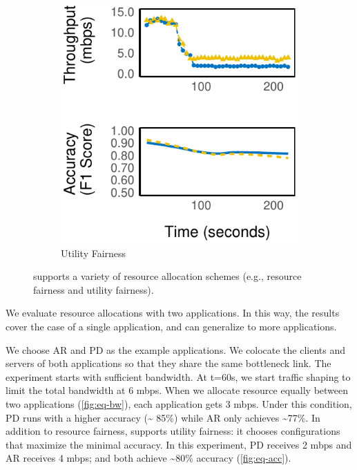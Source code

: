 \begin{figure}
\begin{subfigure}[t]{0.45\columnwidth}
    \includegraphics[width=\textwidth]{figures/multitask-right.pdf}
    \caption{Utility Fairness}
    \label{fig:eq-acc}
  \end{subfigure}
  \caption{\sysname{} supports a variety of resource allocation schemes (e.g.,
    resource fairness and utility fairness).}
  \label{fig:multitask}
\end{figure}

We evaluate resource allocations with two applications. In this way, the results
cover the case of a single application, and can generalize to more applications.

We choose AR and PD as the example applications.  We colocate the clients and
servers of both applications so that they share the same bottleneck link. The
experiment starts with sufficient bandwidth. At t=60s, we start traffic shaping
to limit the total bandwidth at 6 mbps. When we allocate resource equally
between two applications (\autoref{fig:eq-bw}), each application gets 3
mbps. Under this condition, PD runs with a higher accuracy (\textasciitilde
85\%) while AR only achieves \textasciitilde 77\%. In addition to resource
fairness, \sysname{} supports utility fairness: it chooses configurations that
maximize the minimal accuracy. In this experiment, PD receives 2 mbps and AR
receives 4 mbps; and both achieve \textasciitilde 80\% accuracy
(\autoref{fig:eq-acc}).


